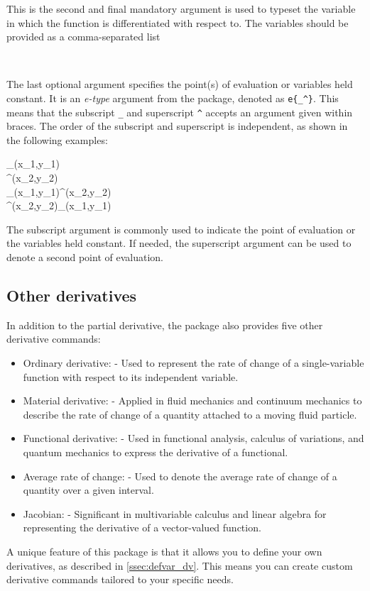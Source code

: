 \begin{function}
	\begin{argument}{6}
		This is the second and final mandatory argument is used to typeset the variable in which the function is differentiated with respect to. The variables should be provided as a comma-separated list
		\begin{example}
			 \\
		\end{example}
	\end{argument}
	
	\clearpage
	\begin{argument}{7}
		The last optional argument specifies the point(s) of evaluation or variables held constant. It is an \emph{e-type} argument from the  package, denoted as \verb|e{_^}|. This means that the subscript \verb|_| and superscript \verb|^| accepts an argument given within braces. The order of the subscript and superscript is independent, as shown in the following examples:
		\begin{example}
			_{(x_1,y_1)} \\
			^{(x_2,y_2)} \\
			_{(x_1,y_1)}^{(x_2,y_2)} \\
			^{(x_2,y_2)}_{(x_1,y_1)}
		\end{example}
		The subscript argument is commonly used to indicate the point of evaluation or the variables held constant. If needed, the superscript argument can be used to denote a second point of evaluation.
	\end{argument}
\end{function}

\subsection{Other derivatives}
In addition to the partial derivative, the package also provides five other derivative commands:
\begin{itemize}
	\item Ordinary derivative: \macro{\odv} - Used to represent the rate of change of a single-variable function with respect to its independent variable.
	\item Material derivative: \macro{\mdv} - Applied in fluid mechanics and continuum mechanics to describe the rate of change of a quantity attached to a moving fluid particle.
	\item Functional derivative: \macro{\fdv} - Used in functional analysis, calculus of variations, and quantum mechanics to express the derivative of a functional.
	\item Average rate of change: \macro{\adv} - Used to denote the average rate of change of a quantity over a given interval.
	\item Jacobian: \macro{\jdv} - Significant in multivariable calculus and linear algebra for representing the derivative of a vector-valued function.
\end{itemize}
A unique feature of this package is that it allows you to define your own derivatives, as described in \cref{ssec:defvar_dv}. This means you can create custom derivative commands tailored to your specific needs.


